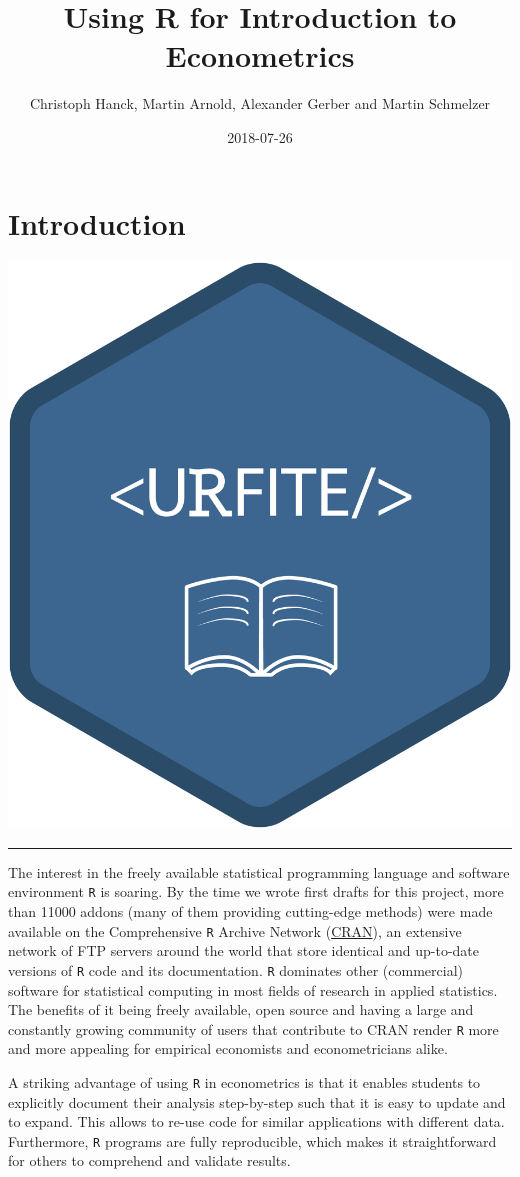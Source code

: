 \documentclass[]{book}
\title{Using R for Introduction to Econometrics}
\author{Christoph Hanck, Martin Arnold, Alexander Gerber and Martin Schmelzer}
\date{2018-07-26}
\theoremstyle{definition}
\theoremstyle{definition}
\theoremstyle{definition}
\theoremstyle{remark}
\begin{document}
\maketitle

{
\setcounter{tocdepth}{1}
\tableofcontents
}
\chapter{Introduction}\label{introduction}

\begin{center}\includegraphics[width=0.45\linewidth]{images/URFITE_logo} \end{center}

\noindent\rule{\textwidth}{1pt}

The interest in the freely available statistical programming language
and software environment \texttt{R} \citep{R-base} is soaring. By the
time we wrote first drafts for this project, more than 11000 addons
(many of them providing cutting-edge methods) were made available on the
Comprehensive \texttt{R} Archive Network
(\href{https://cran.r-project.org/}{CRAN}), an extensive network of FTP
servers around the world that store identical and up-to-date versions of
\texttt{R} code and its documentation. \texttt{R} dominates other
(commercial) software for statistical computing in most fields of
research in applied statistics. The benefits of it being freely
available, open source and having a large and constantly growing
community of users that contribute to CRAN render \texttt{R} more and
more appealing for empirical economists and econometricians alike.

A striking advantage of using \texttt{R} in econometrics is that it
enables students to explicitly document their analysis step-by-step such
that it is easy to update and to expand. This allows to re-use code for
similar applications with different data. Furthermore, \texttt{R}
programs are fully reproducible, which makes it straightforward for
others to comprehend and validate results.
\end{document}
